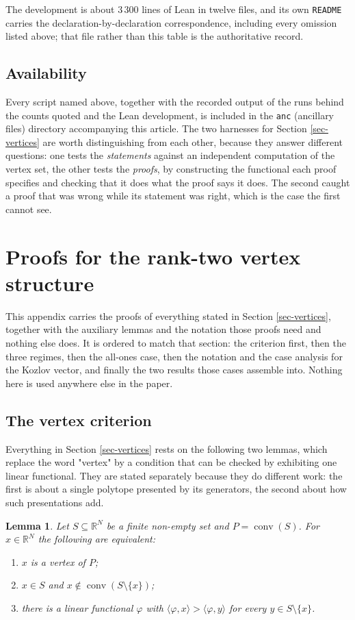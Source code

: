 \documentclass[11pt, a4paper, abstract=yes]{scrartcl}
\theoremstyle{definition}
\theoremstyle{remark}
\theoremstyle{plain}
\newtheorem{lemma}[definition]{Lemma}
\newcommand{\conv}{\operatorname{conv}}
\begin{document}
The development is about \(3\,300\) lines of Lean in twelve files, and its own \texttt{README} carries the
declaration-by-declaration correspondence, including every omission listed above; that file rather
than this table is the authoritative record.
\subsection{Availability}
\label{sec-methods-anc}
Every script named above, together with the recorded output of the runs behind the counts quoted
and the Lean development, is included in the \texttt{anc} (ancillary files) directory accompanying this
article. The two harnesses
for Section \ref{sec-vertices} are worth distinguishing from each other, because they answer
different questions: one tests the \emph{statements} against an independent computation of the vertex
set, the other tests the \emph{proofs}, by constructing the functional each proof specifies and checking
that it does what the proof says it does. The second caught a proof that was wrong while its
statement was right, which is the case the first cannot see.

\appendix
\section{Proofs for the rank-two vertex structure}
\label{sec-app}
\label{sec:app}
This appendix carries the proofs of everything stated in Section \ref{sec-vertices}, together with
the auxiliary lemmas and the notation those proofs need and nothing else does. It is ordered to
match that section: the criterion first, then the three regimes, then the all-ones case, then the
notation and the case analysis for the Kozlov vector, and finally the two results those cases
assemble into. Nothing here is used anywhere else in the paper.
\subsection{The vertex criterion}
\label{sec-app-criterion}
Everything in Section \ref{sec-vertices} rests on the following two lemmas, which replace the word "vertex" by a
condition that can be checked by exhibiting one linear functional. They are stated separately
because they do different work: the first is about a single polytope presented by its generators,
the second about how such presentations add.

\begin{lemma}
Let \(S\subseteq\mathbb R^N\) be a finite non-empty set and \(P=\conv(S)\). For \(x\in\mathbb R^N\)
the following are equivalent:
\begin{enumerate}
\item \(x\) is a vertex of \(P\);
\item \(x\in S\) and \(x\notin\conv(S\setminus\lbrace x\rbrace)\);
\item there is a linear functional \(\varphi\) with \(\langle\varphi,x\rangle>\langle\varphi,y\rangle\)
for every \(y\in S\setminus\lbrace x\rbrace\).
\end{enumerate}
\label{lem:exposed-vertex}
\label{lem-exposed-vertex}
\end{lemma}
\end{document}

